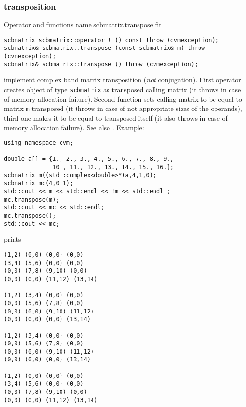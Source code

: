 \subsubsection{transposition}
Operator and functions%
\pdfdest name {scbmatrix.transpose} fit
\begin{verbatim}
scbmatrix scbmatrix::operator ! () const throw (cvmexception);
scbmatrix& scbmatrix::transpose (const scbmatrix& m) throw (cvmexception);
scbmatrix& scbmatrix::transpose () throw (cvmexception);
\end{verbatim}
implement complex band matrix transposition (\emph{not} conjugation).
First operator creates  object of type \verb"scbmatrix" as
 transposed calling matrix
(it throws  
in case of memory allocation failure). 
Second function sets  calling matrix to be equal to  matrix
\verb"m" transposed
(it throws  
in case of not appropriate sizes of the operands), 
third one makes it to be equal to
transposed itself (it also throws  
in case of memory allocation failure). 
See also .
Example:
\begin{Verbatim}
using namespace cvm;

double a[] = {1., 2., 3., 4., 5., 6., 7., 8., 9.,
              10., 11., 12., 13., 14., 15., 16.};
scbmatrix m((std::complex<double>*)a,4,1,0);
scbmatrix mc(4,0,1);
std::cout << m << std::endl << !m << std::endl ;
mc.transpose(m);
std::cout << mc << std::endl;
mc.transpose();
std::cout << mc;
\end{Verbatim}
prints
\begin{Verbatim}
(1,2) (0,0) (0,0) (0,0)
(3,4) (5,6) (0,0) (0,0)
(0,0) (7,8) (9,10) (0,0)
(0,0) (0,0) (11,12) (13,14)

(1,2) (3,4) (0,0) (0,0)
(0,0) (5,6) (7,8) (0,0)
(0,0) (0,0) (9,10) (11,12)
(0,0) (0,0) (0,0) (13,14)

(1,2) (3,4) (0,0) (0,0)
(0,0) (5,6) (7,8) (0,0)
(0,0) (0,0) (9,10) (11,12)
(0,0) (0,0) (0,0) (13,14)

(1,2) (0,0) (0,0) (0,0)
(3,4) (5,6) (0,0) (0,0)
(0,0) (7,8) (9,10) (0,0)
(0,0) (0,0) (11,12) (13,14)
\end{Verbatim}
\newpage









